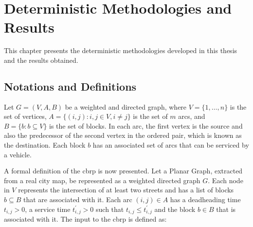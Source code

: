 \chapter{Deterministic Methodologies and Results}
\label{chp:deterministic-methodologies-and-results}

This chapter presents the deterministic methodologies developed in this thesis and the results obtained.

\section{Notations and Definitions}\label{sec:notations-and-definitions}

Let $G = (V, A, B)$ be a weighted and directed graph, where $V = \{1, \dots,
	n\}$ is the set of vertices, $A = \{(i, j) : i, j \in V, i \neq j\}$ is the
set of $m$ arcs, and $B = \{b : b \subseteq V\}$ is the set of blocks. In
each arc, the first vertex is the source and also the predecessor of the
second vertex in the ordered pair, which is known as the destination. Each
block $b$ has an associated set of arcs that can be
serviced by a vehicle.

A formal definition of the \gls{cbrp} is now presented. Let a Planar Graph,
extracted from a real city map, be represented as a weighted directed graph $G$.
Each node in $V$ represents the intersection of at least two streets and has a
list of blocks $b \subseteq B$ that are associated with it. Each arc $(i, j) \in
	A$ has a deadheading time $t_{i, j} > 0$, a service time $t^{'}_{i, j} > 0$ such
that $t_{i, j} \leqslant t^{'}_{i, j}$ and the block $b \in B$ that is
associated with it. The input to the \gls{cbrp} is defined as:


